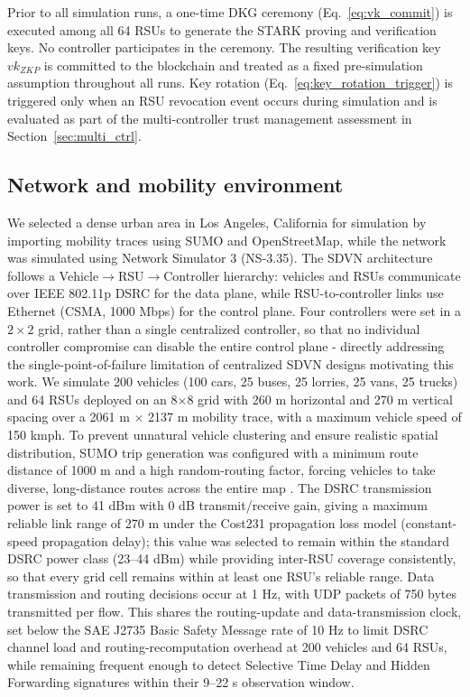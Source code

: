 \documentclass[12pt, a4paper]{report}
\begin{document}
{{Prior to all simulation runs, a one-time \ac{DKG}
ceremony (Eq.~\ref{eq:vk_commit}) is executed among
all 64 RSUs to generate the \ac{STARK} proving and
verification keys. No controller participates in the
ceremony. The resulting verification key $vk_{ZKP}$
is committed to the blockchain and treated as a fixed
pre-simulation assumption throughout all runs.
Key rotation (Eq.~\ref{eq:key_rotation_trigger}) is
triggered only when an RSU revocation event occurs
during simulation and is evaluated as part of the
multi-controller trust management assessment in
Section~\ref{sec:multi_ctrl}.

\subsection{Network and mobility environment}
We selected a dense urban area in Los Angeles, California for simulation by importing mobility traces using SUMO and OpenStreetMap, while the network was simulated using Network Simulator 3 (NS-3.35). The SDVN architecture follows a Vehicle$\rightarrow$RSU$\rightarrow$Controller hierarchy: vehicles and RSUs communicate over IEEE 802.11p DSRC for the data plane, while RSU-to-controller links use Ethernet (CSMA, 1000 Mbps) for the control plane. Four controllers were set in a $2\times2$ grid, rather than a single centralized controller, so that no individual controller compromise can disable the entire control plane - directly addressing the single-point-of-failure limitation of centralized SDVN designs motivating this work.  We simulate 200 vehicles (100 cars, 25 buses, 25 lorries, 25 vans, 25 trucks) and 64 RSUs deployed on an 8$\times$8 grid with 260 m horizontal and 270 m vertical spacing over a 2061 m $\times$ 2137 m mobility trace, with a maximum vehicle speed of 150 kmph. To prevent unnatural vehicle clustering and ensure realistic spatial distribution, SUMO trip generation was configured with a minimum route distance of 1000 m and a high random-routing factor, forcing vehicles to take diverse, long-distance routes across the entire map \cite{sumo_randomtrips}. The DSRC transmission power is set to 41 dBm with 0 dB transmit/receive gain, giving a maximum reliable link range of 270 m under the Cost231 propagation loss model (constant-speed propagation delay); this value was selected to remain within the standard DSRC power class (23--44 dBm)\cite{FCC03-324} while providing inter-RSU coverage consistently, so that every grid cell remains within at least one RSU's reliable range. Data transmission and routing decisions occur at 1 Hz, with UDP packets of 750 bytes transmitted per flow. This shares the routing-update and data-transmission clock, set below the SAE J2735 Basic Safety Message rate of 10 Hz \cite{sae_j2735} to limit DSRC channel load and routing-recomputation overhead at 200 vehicles and 64 RSUs, while remaining frequent enough to detect Selective Time Delay and Hidden Forwarding signatures within their 9--22 s observation window.

}}
\end{document}
